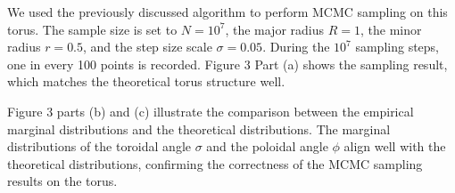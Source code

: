 \documentclass{article}
\begin{document}
We used the previously discussed algorithm to perform MCMC sampling on this torus. The sample size is set to \(N = 10^7\), the major radius \(R = 1\), the minor radius \(r = 0.5\), and the step size scale \(\sigma = 0.05\). During the \(10^7\) sampling steps, one in every 100 points is recorded. Figure 3 Part (a) shows the sampling result, which matches the theoretical torus structure well.




        
    


Figure 3 parts (b) and (c) illustrate the comparison between the empirical marginal distributions and the theoretical distributions. The marginal distributions of the toroidal angle \(\sigma\) and the poloidal angle \(\phi\) align well with the theoretical distributions, confirming the correctness of the MCMC sampling results on the torus.


    
\end{document}
